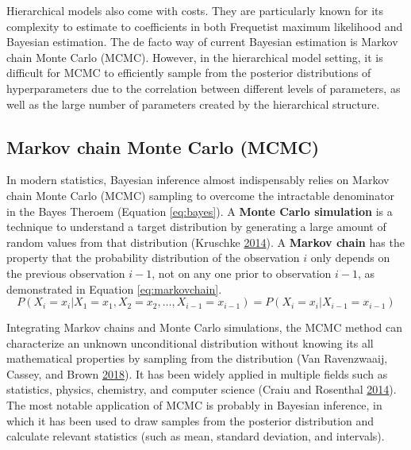 \documentclass[12pt]{book}
\numberwithin{equation}{chapter}
\begin{document}
Hierarchical models also come with costs. They are particularly known for its complexity to estimate to coefficients in both Frequetist maximum likelihood and Bayesian estimation. The de facto way of current Bayesian estimation is Markov chain Monte Carlo (MCMC). However, in the hierarchical model setting, it is difficult for MCMC to efficiently sample from the posterior distributions of hyperparameters due to the correlation between different levels of parameters, as well as the large number of parameters created by the hierarchical structure.

\hypertarget{markov-chain-monte-carlo-mcmc}{%
\subsection{Markov chain Monte Carlo (MCMC)}\label{markov-chain-monte-carlo-mcmc}}

In modern statistics, Bayesian inference almost indispensably relies on Markov chain Monte Carlo (MCMC) sampling to overcome the intractable denominator in the Bayes Theroem (Equation \eqref{eq:bayes}). A \textbf{Monte Carlo simulation} is a technique to understand a target distribution by generating a large amount of random values from that distribution (Kruschke \protect\hyperlink{ref-kruschke2014doing}{2014}). A \textbf{Markov chain} has the property that the probability distribution of the observation \(i\) only depends on the previous observation \(i-1\), not on any one prior to observation \(i-1\), as demonstrated in Equation \eqref{eq:markovchain}.
\begin{equation}
P\left(X_{i}=x_{i} | X_{1}=x_{1}, X_{2}=x_{2}, \ldots, X_{i-1}=x_{i-1}\right) = P\left(X_{i}=x_{i} | X_{i-1}=x_{i-1}\right)
\label{eq:markovchain}
\end{equation}

Integrating Markov chains and Monte Carlo simulations, the MCMC method can characterize an unknown unconditional distribution without knowing its all mathematical properties by sampling from the distribution (Van Ravenzwaaij, Cassey, and Brown \protect\hyperlink{ref-van2018simple}{2018}). It has been widely applied in multiple fields such as statistics, physics, chemistry, and computer science (Craiu and Rosenthal \protect\hyperlink{ref-craiu2014bayesian}{2014}). The most notable application of MCMC is probably in Bayesian inference, in which it has been used to draw samples from the posterior distribution and calculate relevant statistics (such as mean, standard deviation, and intervals).
\end{document}
